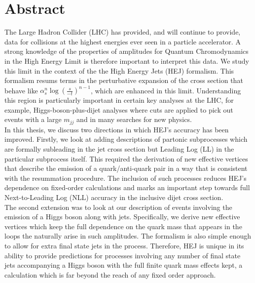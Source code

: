 \chapter{Abstract}

The Large Hadron Collider (LHC) has provided, and will continue to provide, data for collisions at the highest energies ever seen in a particle accelerator. A strong knowledge of the properties of amplitudes for Quantum Chromodynamics in the High Energy Limit is therefore important to interpret this data. We study this limit in the context of the the High Energy Jets (HEJ) formalism. This formalism resums terms in the perturbative expansion of the cross section that behave like $\alpha_s^n \log(\frac{s}{-t})^{n-1}$, which are enhanced in this limit. Understanding this region is particularly important in certain key analyses at the LHC, for example, Higgs-boson-plus-dijet analyses where cuts are applied to pick out events with a large $m_{jj}$ and in many searches for new physics. \\
In this thesis, we discuss two directions in which HEJ's accuracy has been improved. Firstly, we look at adding descriptions of partonic subprocesses which are formally subleading in the jet cross section but Leading Log (LL) in the particular subprocess itself. This required the derivation of new effective vertices that describe the emission of a quark/anti-quark pair in a way that is consistent with the resummation procedure. The inclusion of such processes reduces HEJ's dependence on fixed-order calculations and marks an important step towards full Next-to-Leading Log (NLL) accuracy in the inclusive dijet cross section. \\
The second extension was to look at our description of events involving the emission of a Higgs boson along with jets. Specifically, we derive new effective vertices which keep the full dependence on the quark mass that appears in the loops the naturally arise in such amplitudes. The formalism is also simple enough to allow for extra final state jets in the process. Therefore, HEJ is unique in its ability to provide predictions for processes involving any number of final state jets accompanying a Higgs boson with the full finite quark mass effects kept, a calculation which is far beyond the reach of any fixed order approach. 

